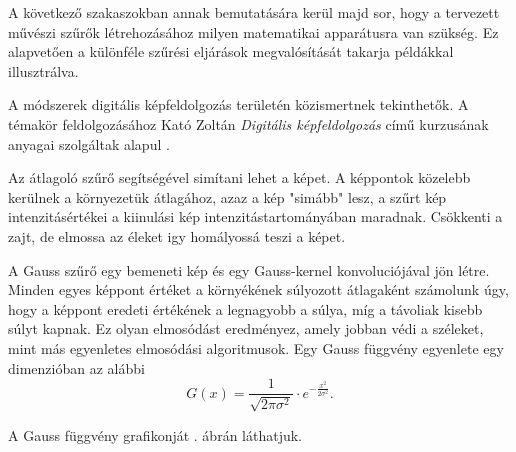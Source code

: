 


A következő szakaszokban annak bemutatására kerül majd sor, hogy a tervezett művészi szűrők létrehozásához milyen matematikai apparátusra van szükség. Ez alapvetően a különféle szűrési eljárások megvalósítását takarja példákkal illusztrálva.

A módszerek digitális képfeldolgozás területén közismertnek tekinthetők. A témakör feldolgozásához Kató Zoltán \textit{Digitális képfeldolgozás} című kurzusának anyagai szolgáltak alapul \cite{kato}.


Az átlagoló szűrő segítségével simítani lehet a képet. A képpontok közelebb kerülnek a környezetük átlagához, azaz a kép "simább" lesz, a szűrt kép intenzitásértékei a kiinulási kép intenzitástartományában maradnak. Csökkenti a zajt, de elmossa az éleket igy homályossá teszi a képet.




A Gauss szűrő egy bemeneti kép és egy Gauss-kernel konvoluciójával jön létre. Minden egyes képpont értéket a környékének súlyozott átlagaként számolunk úgy, hogy a képpont eredeti értékének a legnagyobb a súlya, míg a távoliak kisebb súlyt kapnak. Ez olyan elmosódást eredményez, amely jobban védi a széleket, mint más egyenletes elmosódási algoritmusok. Egy Gauss függvény egyenlete egy dimenzióban az alábbi
$$
G(x) =
\frac{1}{\sqrt{2\pi\sigma^{2}}}
\cdot e^{-\frac{x^{2}}{2\sigma^{2}}}.
$$

A Gauss függvény grafikonját . ábrán láthatjuk.


